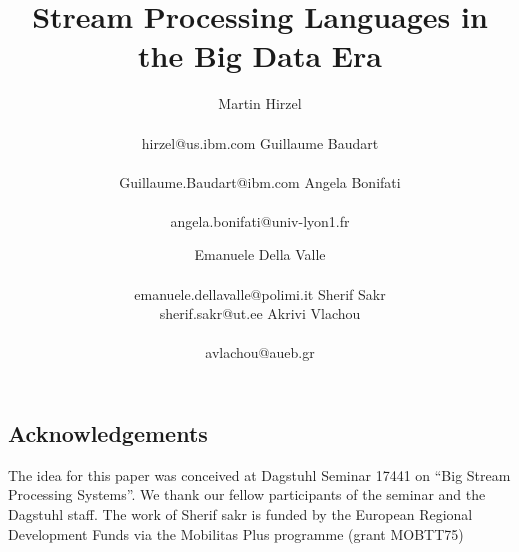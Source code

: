 \documentclass[preprint]{sig-alternate-10pt}
\begin{document}
\title{Stream Processing Languages in the Big Data Era}

\newcommand*{\emailn}[1]{\textsf{\normalsize #1}}

\author{
\alignauthor
Martin Hirzel\\
  \\
  \emailn{hirzel@us.ibm.com}
\alignauthor
Guillaume Baudart\\
  \\
  \emailn{Guillaume.Baudart@ibm.com}
\alignauthor
Angela Bonifati\\
  \\
  \emailn{angela.bonifati@univ-lyon1.fr}
\and
\alignauthor
Emanuele Della Valle\\
  \\
  \emailn{emanuele.dellavalle@polimi.it}
\alignauthor
Sherif Sakr\\
  \emailn{sherif.sakr@ut.ee}
\alignauthor
Akrivi Vlachou\\
  \\
  \emailn{avlachou@aueb.gr}}

\maketitle

\begin{abstract}
  
\end{abstract}







\subsection*{Acknowledgements}

The idea for this paper was conceived at Dagstuhl Seminar 17441 on
``Big Stream Processing Systems''. We thank our fellow participants of
the seminar and the Dagstuhl staff. The work of Sherif sakr is funded by the European Regional Development Funds via the Mobilitas Plus programme (grant MOBTT75)


\balance

\end{document}
